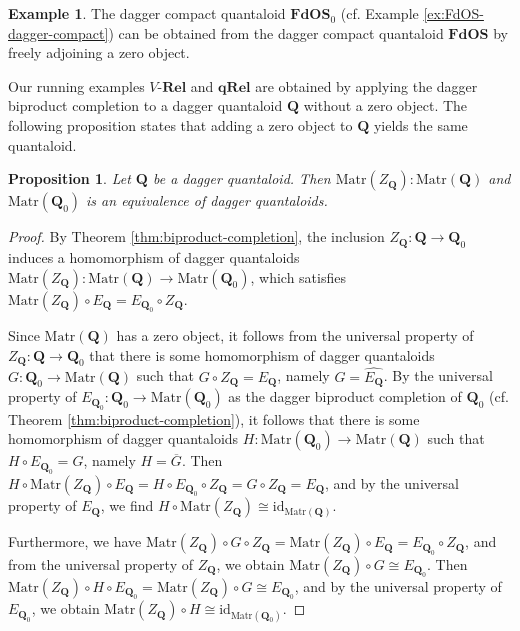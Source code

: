 \documentclass[12pt]{tac}
\newtheorem{proposition}[theorem]{Proposition}
\theoremstyle{definition}
\newtheorem{example}[theorem]{Example}
\theoremstyle{remark}
\newcommand{\<}{\langle}
\renewcommand{\>}{\rangle}
\renewcommand{\:}{\colon}
\newcommand{\id}{\mathrm{id}}
\begin{document}
\begin{example}
 The dagger compact quantaloid $\mathbf{FdOS}_0$ (cf. Example \ref{ex:FdOS-dagger-compact}) can be obtained from the dagger compact quantaloid $\mathbf{FdOS}$ by freely adjoining a zero object.
\end{example}

Our running examples $V$-$\mathbf{Rel}$ and $\mathbf{qRel}$ are obtained by applying the dagger biproduct completion to a dagger quantaloid $\mathbf Q$ without a zero object. The following proposition states that adding a zero object to $\mathbf Q$ yields the same quantaloid. 
\begin{proposition}\label{prop:MatrQ0isMatrQ}
    Let $\mathbf Q$ be a dagger quantaloid. Then $\mathrm{Matr}(Z_\mathbf Q):\mathrm{Matr}(\mathbf Q)$ and $\mathrm{Matr}(\mathbf Q_0)$ is an equivalence of dagger quantaloids.
\end{proposition}
\begin{proof}
By Theorem \ref{thm:biproduct-completion}, the inclusion $Z_\mathbf Q:\mathbf Q\to\mathbf Q_0$ induces a homomorphism of dagger quantaloids $\mathrm{Matr}(Z_\mathbf Q):\mathrm{Matr}(\mathbf Q)\to\mathrm{Matr}(\mathbf Q_0)$, which satisfies $\mathrm{Matr}(Z_\mathbf Q)\circ E_\mathbf Q=E_{\mathbf Q_0}\circ Z_\mathbf Q$.

Since $\mathrm{Matr}(\mathbf Q)$ has a zero object, it follows from the universal property of $Z_\mathbf Q:\mathbf Q\to\mathbf Q_0$ that there is some homomorphism of dagger quantaloids $G:\mathbf Q_0\to\mathrm{Matr}(\mathbf Q)$ such that $G\circ Z_\mathbf Q=E_\mathbf Q$, namely $G=\widehat{E_\mathbf Q}$. By the universal property of $E_{\mathbf Q_0}:\mathbf Q_0\to\mathrm{Matr}(\mathbf Q_0)$ as the dagger biproduct completion of $\mathbf Q_0$ (cf. Theorem \ref{thm:biproduct-completion}), it follows that there is some homomorphism of dagger quantaloids $H:\mathrm{Matr}(\mathbf Q_0)\to\mathrm{Matr}(\mathbf Q)$ such that $H\circ E_{\mathbf Q_0}=G$, namely $H=\overline{G}$. Then $H\circ\mathrm{Matr}(Z_\mathbf Q)\circ E_{\mathbf Q}=H\circ E_{\mathbf Q_0}\circ Z_\mathbf Q=G\circ Z_\mathbf Q=E_\mathbf Q$, and by the universal property of $E_\mathbf Q$, we find $H\circ\mathrm{Matr}(Z_\mathbf Q)\cong \id_{\mathrm{Matr}(\mathbf Q)}$.

Furthermore, we have $\mathrm{Matr}(Z_\mathbf Q)\circ G\circ Z_\mathbf Q=\mathrm{Matr}(Z_\mathbf Q)\circ E_\mathbf Q=E_{\mathbf Q_0}\circ Z_\mathbf Q$, and from the universal property of $Z_\mathbf Q$, we obtain $\mathrm{Matr}(Z_\mathbf Q)\circ G\cong E_{\mathbf Q_0}$. Then $\mathrm{Matr}(Z_\mathbf Q)\circ H\circ E_{\mathbf Q_0}=\mathrm{Matr}(Z_\mathbf Q)\circ G\cong E_{\mathbf Q_0}$, and by the universal property of $E_{\mathbf Q_0}$, we obtain $\mathrm{Matr}(Z_\mathbf Q)\circ H\cong\id_{\mathrm{Matr}(\mathbf Q_0)}$. 
\end{proof}
\end{document}

